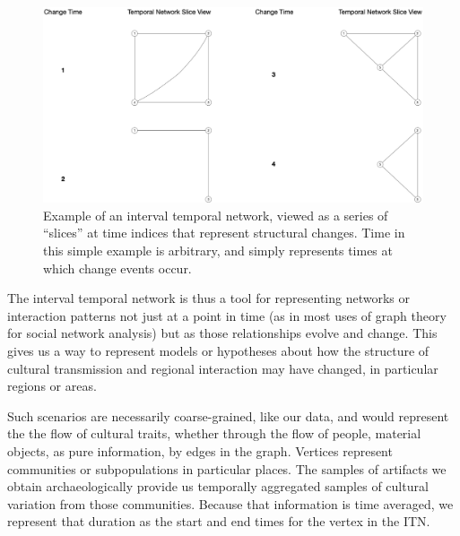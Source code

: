     
    \begin{figure}[ht]
    \centering
    \includegraphics[scale=0.20]{graphics/multipleseriation/interval-temporal-network-sliced-view.png}
    \caption{Example of an interval temporal network, viewed as a series of ``slices'' at time indices that represent structural changes.  Time in this simple example is arbitrary, and simply represents times at which change events occur.}
    \label{metapop:fig:itn-sliced-example}
    \end{figure}
    
    The interval temporal network is thus a tool for representing networks or interaction patterns not just at a point in time (as in most uses of graph theory for social network analysis) but as those relationships evolve and change.  This gives us a way to represent models or hypotheses about how the structure of cultural transmission and regional interaction may have changed, in particular regions or areas.  
    
    Such scenarios are necessarily coarse-grained, like our data, and would represent the the flow of cultural traits, whether through the flow of people, material objects, as pure information, by edges in the graph.  Vertices represent communities or subpopulations in particular places.  The samples of artifacts we obtain archaeologically provide us temporally aggregated  samples of cultural variation from those communities.  Because that information is time averaged, we represent that duration as the start and end times for the vertex in the ITN.  
    
